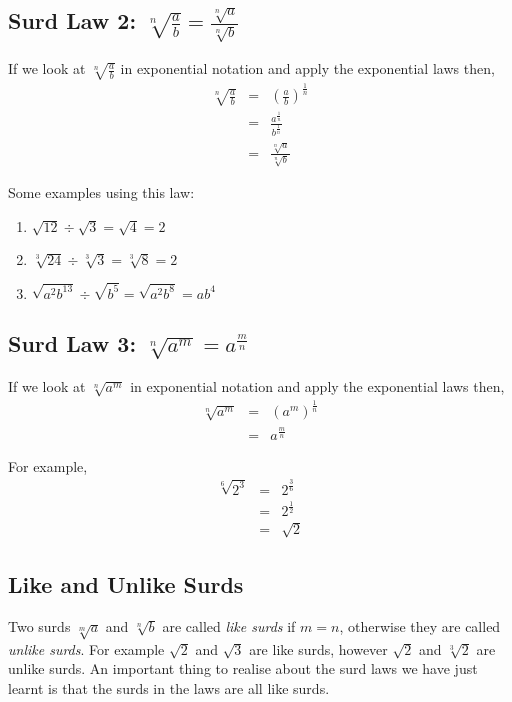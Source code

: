 \subsection{Surd Law 2: $\sqrt[n]{\frac ab}=\frac{\sqrt[n]{a}}{\sqrt[n]{b}}$}
If we look at $\sqrt[n]{\frac ab}$ in exponential notation and
apply the exponential laws then,
\begin{eqnarray}
\label{eq:mn:s:2:exp}
\sqrt[n]{\frac ab}&=&\left(\frac ab\right)^{\frac 1n}\\ \nonumber
&=&\frac{a^{\frac 1n}}{b^{\frac 1n}}\\ \nonumber
&=&\frac{\sqrt[n]{a}}{\sqrt[n]{b}}
\end{eqnarray}

Some examples using this law:
\begin{enumerate}
\item{$\sqrt{12}\div \sqrt{3}=\sqrt{4}=2$}
\item{$\sqrt[3]{24}\div \sqrt[3]{3}=\sqrt[3]{8}=2$}
\item{$\sqrt{a^2b^{13}}\div \sqrt{b^5}=\sqrt{a^2b^8}= ab^4$}
\end{enumerate}


\subsection{Surd Law 3: $\sqrt[n]{a^m}=a^{\frac mn}$}
If we look at $\sqrt[n]{a^m}$ in exponential notation and apply the exponential laws then,
\begin{eqnarray}
\label{eq:mn:s:3:exp}
\sqrt[n]{a^m}&=&(a^m)^{\frac 1n}\\ \nonumber
&=&a^{\frac mn}
\end{eqnarray}

For example,
\begin{eqnarray*}
\sqrt[6]{2^{3}} &=& 2^{\frac{3}{6}}\\
&=& 2^{\frac{1}{2}}\\
&=& \sqrt{2}
\end{eqnarray*}

\subsection{Like and Unlike Surds}
Two surds $\sqrt[m]{a}$ and $\sqrt[n]{b}$ are called \textit{like surds} if
$m=n$, otherwise they are called \textit{unlike surds}. For example $\sqrt{2}$ and $\sqrt{3}$ are like surds, however $\sqrt{2}$ and $\sqrt[3]{2}$ are unlike surds. An important thing to realise about the surd laws we have just learnt is that the surds in the laws are all like surds.

